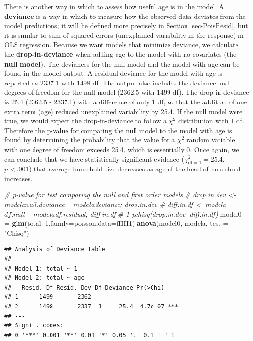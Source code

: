 \documentclass[
]{krantz}
\newenvironment{Shaded}{\begin{snugshade}}{\end{snugshade}}
\newcommand{\CommentTok}[1]{\textcolor[rgb]{0.37,0.37,0.37}{\textit{#1}}}
\newcommand{\DataTypeTok}[1]{\textcolor[rgb]{0.27,0.27,0.27}{#1}}
\newcommand{\DecValTok}[1]{\textcolor[rgb]{0.06,0.06,0.06}{#1}}
\newcommand{\KeywordTok}[1]{\textcolor[rgb]{0.27,0.27,0.27}{\textbf{#1}}}
\newcommand{\NormalTok}[1]{#1}
\newcommand{\OperatorTok}[1]{\textcolor[rgb]{0.43,0.43,0.43}{\textbf{#1}}}
\newcommand{\StringTok}[1]{\textcolor[rgb]{0.5,0.5,0.5}{#1}}
\begin{document}
There is another way in which to assess how useful age is in the model. A \textbf{deviance} is a way in which to measure how the observed data deviates from the model predictions; it will be defined more precisely in Section \ref{sec-PoisResid}, but it is similar to sum of squared errors (unexplained variability in the response) in OLS regression. Because we want models that minimize deviance, we calculate the \textbf{drop-in-deviance} when adding age to the model with no covariates (the \textbf{null model}). The deviances for the null model and the model with age can be found in the model output. A residual deviance for the model with age is reported as 2337.1 with 1498 df. The output also includes the deviance and degrees of freedom for the null model (2362.5 with 1499 df). The drop-in-deviance is 25.4 (2362.5 - 2337.1) with a difference of only 1 df, so that the addition of one extra term (age) reduced unexplained variability by 25.4. If the null model were true, we would expect the drop-in-deviance to follow a \(\chi^2\) distribution with 1 df. Therefore the p-value for comparing the null model to the model with age is found by determining the probability that the value for a \(\chi^2\) random variable with one degree of freedom exceeds 25.4, which is essentially 0. Once again, we can conclude that we have statistically significant evidence (\(\chi^2_{\text{df} =1}=25.4\), \(p < .001\)) that average household size decreases as age of the head of household increases.

\begin{Shaded}
\begin{Highlighting}[]
\CommentTok{# p-value for test comparing the null and first order models}
\CommentTok{# drop.in.dev <- modela$null.deviance - modela$deviance; drop.in.dev}
\CommentTok{# diff.in.df <- modela$df.null - modela$df.residual; diff.in.df}
\CommentTok{# 1-pchisq(drop.in.dev, diff.in.df)}
\NormalTok{model0 =}\StringTok{ }\KeywordTok{glm}\NormalTok{(total}\OperatorTok{~}\DecValTok{1}\NormalTok{,}\DataTypeTok{family=}\NormalTok{poisson,}\DataTypeTok{data=}\NormalTok{fHH1)}
\KeywordTok{anova}\NormalTok{(model0, modela, }\DataTypeTok{test =} \StringTok{"Chisq"}\NormalTok{)}
\end{Highlighting}
\end{Shaded}

\begin{verbatim}
## Analysis of Deviance Table
## 
## Model 1: total ~ 1
## Model 2: total ~ age
##   Resid. Df Resid. Dev Df Deviance Pr(>Chi)    
## 1      1499       2362                         
## 2      1498       2337  1     25.4  4.7e-07 ***
## ---
## Signif. codes:  
## 0 '***' 0.001 '**' 0.01 '*' 0.05 '.' 0.1 ' ' 1
\end{verbatim}
\end{document}
